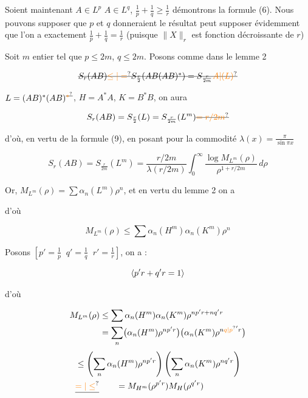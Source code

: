 Soient maintenant  $A\in L^p$ $A\in L^q$, $\frac1p+\frac1q\geq\frac1r$ démontrons la formule (6). Nous pouvons supposer  que $p$ et $q$    donneraient le résultat   peut supposer évidemment  que l'on a exactement $\frac1p+\frac1q=\frac1r$ (puisque $\|X\|_r$ est fonction décroissante de $r$)

Soit $m$  entier tel que $p\leq 2m$, $q\leq 2m$.  Posons comme dans le lemme 2


\[
\deleted{S_r(AB)\unsure{\leq|=} S_{\frac r2}(AB(AB)^*)=S_{\frac r{2m}}\unsure{A|(L)}}
\]

$L=(AB)^*(AB)^{\deleted{\unsure{*}}}$, $H=A^*A$, $K=B^*B$, on aura

\[
S_r(AB)=S_{\frac r2}(L)=S_{\frac r{2m}}(L^m)\deleted{\unsure{=r/2m}}
\]

d'où, en vertu de la formule (9), en posant pour la commodité $\lambda(x)=\frac{\pi}{\sin\pi x}$

\[
S_r(AB)=S_{\frac r{2m}}(L^m)=\frac{r/2m}{\lambda(r/2m)}
\int_0^\infty\frac{\log M_{L^m}(\rho)}{\rho^{1+r/2m}}\,d\rho \tag*{(11)}
\]

 Or, $M_{L^m}(\rho)=\sum\alpha_n(L^m)\rho^n$, et   en vertu du lemme 2 on a 


d'où

\[
M_{L^m}(\rho)\leq\sum\alpha_n(H^m)\alpha_n(K^m)\rho^n
\]

Posons $\left[p'=\frac1p\;\;q'=\frac1q\;\;r'=\frac1r\right]$, on a : 

\[
\inserted{p'r+q'r=1}
\]

d'où

\[
\begin{aligned}
M_{L^m}(\rho)&\leq\sum\alpha_n(H^m)\alpha_n(K^m)\rho^{np'r+nq'r}\\
&=\sum_n\bigl(\alpha_n(H^m)\rho^{np'r}\bigr)
\bigl(\alpha_n(K^m)\rho^{n{\unsure{q|p}}'r}\bigr)
\end{aligned}
\]
\[
\begin{aligned}
&\leq\left(\sum_n\alpha_n(H^m)\rho^{np'r}\right)
\left(\sum_n\alpha_n(K^m)\rho^{nq'r}\right)\\
&\deleted{\unsure{=|\leq}}\qquad=M_{H^m}(\rho^{p'r})M_H(\rho^{q'r})
\end{aligned}
\]

